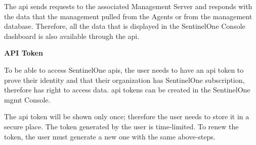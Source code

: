 \begin{multicols}{2}
      The \acrshort{api} sends requests to the associated Management Server and responds with the data that the management pulled from
      the Agents or from the management database. Therefore, all the data that is displayed in the SentinelOne Console dashboard is also
      available through the \acrshort{api}.

      \textbf{API Token}

      To be able to access SentinelOne \acrshort{api}s, the user needs to have an \acrshort{api} token to prove their
      identity and that their organization has SentinelOne subscription, therefore has right to access data.
      \acrshort{api} tokens can be created in the SentinelOne \acrshort{mgmt} Console.

      The \acrshort{api} token will be shown only once; therefore the user needs to store it in a secure place.
      The token generated by the user is time-limited. To renew the token, the user must generate a new one with
      the same above-steps.


\end{multicols}
